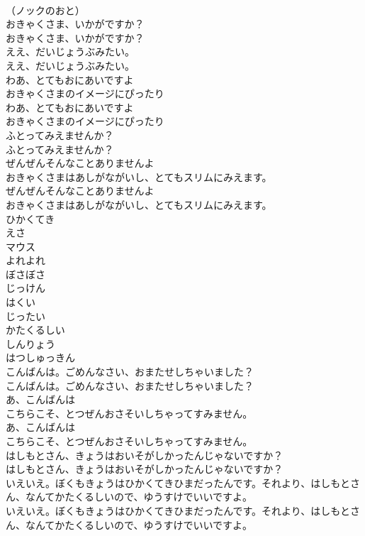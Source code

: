 \documentclass[8pt]{extreport}
\begin{document}
\begin{CJK}{UTF8}{min}
\\	（ノックのおと）
\\	おきゃくさま、いかがですか？
\\	おきゃくさま、いかがですか？
\\	ええ、だいじょうぶみたい。
\\	ええ、だいじょうぶみたい。
\\	わあ、とてもおにあいですよ
\\	おきゃくさまのイメージにぴったり
\\	わあ、とてもおにあいですよ
\\	おきゃくさまのイメージにぴったり
\\	ふとってみえませんか？
\\	ふとってみえませんか？
\\	ぜんぜんそんなことありませんよ
\\	おきゃくさまはあしがながいし、とてもスリムにみえます。
\\	ぜんぜんそんなことありませんよ
\\	おきゃくさまはあしがながいし、とてもスリムにみえます。
\\	ひかくてき
\\	えさ
\\	マウス
\\	よれよれ
\\	ぼさぼさ
\\	じっけん
\\	はくい
\\	じったい
\\	かたくるしい
\\	しんりょう
\\	はつしゅっきん
\\	こんばんは。ごめんなさい、おまたせしちゃいました？
\\	こんばんは。ごめんなさい、おまたせしちゃいました？
\\	あ、こんばんは
\\	こちらこそ、とつぜんおさそいしちゃってすみません。
\\	あ、こんばんは
\\	こちらこそ、とつぜんおさそいしちゃってすみません。
\\	はしもとさん、きょうはおいそがしかったんじゃないですか？
\\	はしもとさん、きょうはおいそがしかったんじゃないですか？
\\	いえいえ。ぼくもきょうはひかくてきひまだったんです。それより、はしもとさん、なんてかたくるしいので、ゆうすけでいいですよ。
\\	いえいえ。ぼくもきょうはひかくてきひまだったんです。それより、はしもとさん、なんてかたくるしいので、ゆうすけでいいですよ。

\end{CJK}
\end{document}
